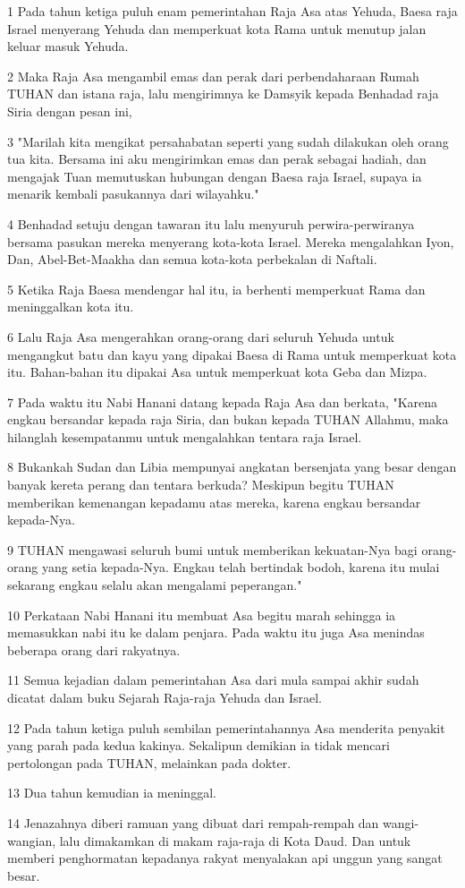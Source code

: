 \par 1 Pada tahun ketiga puluh enam pemerintahan Raja Asa atas Yehuda, Baesa raja Israel menyerang Yehuda dan memperkuat kota Rama untuk menutup jalan keluar masuk Yehuda.
\par 2 Maka Raja Asa mengambil emas dan perak dari perbendaharaan Rumah TUHAN dan istana raja, lalu mengirimnya ke Damsyik kepada Benhadad raja Siria dengan pesan ini,
\par 3 "Marilah kita mengikat persahabatan seperti yang sudah dilakukan oleh orang tua kita. Bersama ini aku mengirimkan emas dan perak sebagai hadiah, dan mengajak Tuan memutuskan hubungan dengan Baesa raja Israel, supaya ia menarik kembali pasukannya dari wilayahku."
\par 4 Benhadad setuju dengan tawaran itu lalu menyuruh perwira-perwiranya bersama pasukan mereka menyerang kota-kota Israel. Mereka mengalahkan Iyon, Dan, Abel-Bet-Maakha dan semua kota-kota perbekalan di Naftali.
\par 5 Ketika Raja Baesa mendengar hal itu, ia berhenti memperkuat Rama dan meninggalkan kota itu.
\par 6 Lalu Raja Asa mengerahkan orang-orang dari seluruh Yehuda untuk mengangkut batu dan kayu yang dipakai Baesa di Rama untuk memperkuat kota itu. Bahan-bahan itu dipakai Asa untuk memperkuat kota Geba dan Mizpa.
\par 7 Pada waktu itu Nabi Hanani datang kepada Raja Asa dan berkata, "Karena engkau bersandar kepada raja Siria, dan bukan kepada TUHAN Allahmu, maka hilanglah kesempatanmu untuk mengalahkan tentara raja Israel.
\par 8 Bukankah Sudan dan Libia mempunyai angkatan bersenjata yang besar dengan banyak kereta perang dan tentara berkuda? Meskipun begitu TUHAN memberikan kemenangan kepadamu atas mereka, karena engkau bersandar kepada-Nya.
\par 9 TUHAN mengawasi seluruh bumi untuk memberikan kekuatan-Nya bagi orang-orang yang setia kepada-Nya. Engkau telah bertindak bodoh, karena itu mulai sekarang engkau selalu akan mengalami peperangan."
\par 10 Perkataan Nabi Hanani itu membuat Asa begitu marah sehingga ia memasukkan nabi itu ke dalam penjara. Pada waktu itu juga Asa menindas beberapa orang dari rakyatnya.
\par 11 Semua kejadian dalam pemerintahan Asa dari mula sampai akhir sudah dicatat dalam buku Sejarah Raja-raja Yehuda dan Israel.
\par 12 Pada tahun ketiga puluh sembilan pemerintahannya Asa menderita penyakit yang parah pada kedua kakinya. Sekalipun demikian ia tidak mencari pertolongan pada TUHAN, melainkan pada dokter.
\par 13 Dua tahun kemudian ia meninggal.
\par 14 Jenazahnya diberi ramuan yang dibuat dari rempah-rempah dan wangi-wangian, lalu dimakamkan di makam raja-raja di Kota Daud. Dan untuk memberi penghormatan kepadanya rakyat menyalakan api unggun yang sangat besar.

